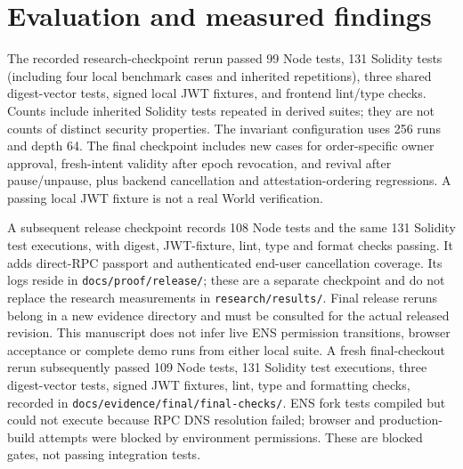 \documentclass[11pt]{article}
\newcommand{\code}[1]{\nolinkurl{#1}}
\begin{document}
\section{Evaluation and measured findings}
The recorded research-checkpoint rerun passed 99 Node tests, 131 Solidity tests (including four local benchmark cases and inherited repetitions), three shared digest-vector tests, signed local JWT fixtures, and frontend lint/type checks. Counts include inherited Solidity tests repeated in derived suites; they are not counts of distinct security properties. The invariant configuration uses 256 runs and depth 64. The final checkpoint includes new cases for order-specific owner approval, fresh-intent validity after epoch revocation, and revival after pause/unpause, plus backend cancellation and attestation-ordering regressions. A passing local JWT fixture is not a real World verification.

A subsequent release checkpoint records 108 Node tests and the same 131 Solidity test executions, with digest, JWT-fixture, lint, type and format checks passing. It adds direct-RPC passport and authenticated end-user cancellation coverage. Its logs reside in \code{docs/proof/release/}; these are a separate checkpoint and do not replace the research measurements in \code{research/results/}. Final release reruns belong in a new evidence directory and must be consulted for the actual released revision. This manuscript does not infer live ENS permission transitions, browser acceptance or complete demo runs from either local suite. A fresh final-checkout rerun subsequently passed 109 Node tests, 131 Solidity test executions, three digest-vector tests, signed JWT fixtures, lint, type and formatting checks, recorded in \code{docs/evidence/final/final-checks/}. ENS fork tests compiled but could not execute because RPC DNS resolution failed; browser and production-build attempts were blocked by environment permissions. These are blocked gates, not passing integration tests.
\end{document}
